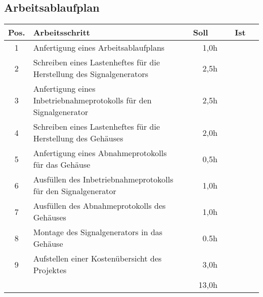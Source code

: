 \begin{landscape}

\section{Arbeitsablaufplan}
\begin{center}
\begin{tabular}{ll|r|r|}
\hline
\multicolumn{1}{|c|}{Pos.} & Arbeitsschritt & ~~Soll~~ & ~~Ist~~ \\ \hline
\multicolumn{1}{|c|}{1} & Anfertigung eines Arbeitsablaufplans & 1,0h &  \\ \hline
\multicolumn{1}{|c|}{2} & Schreiben eines Lastenheftes für die Herstellung des Signalgenerators & 2,5h &  \\ \hline
\multicolumn{1}{|c|}{3} & Anfertigung eines Inbetriebnahmeprotokolls für den Signalgenerator & 2,5h &  \\ \hline
\multicolumn{1}{|c|}{4} & Schreiben eines Lastenheftes für die Herstellung des Gehäuses & 2,0h &  \\ \hline
\multicolumn{1}{|c|}{5} & Anfertigung eines Abnahmeprotokolls für das Gehäuse & 0,5h &  \\ \hline
\multicolumn{1}{|c|}{6} & Ausfüllen des Inbetriebnahmeprotokolls für den Signalgenerator & 1,0h &  \\ \hline
\multicolumn{1}{|c|}{7} & Ausfüllen des Abnahmeprotokolls des Gehäuses & 1,0h &  \\ \hline
\multicolumn{1}{|c|}{8} & Montage des Signalgenerators in das Gehäuse & 0.5h &  \\ \hline
\multicolumn{1}{|c|}{9} & Aufstellen einer Kostenübersicht des Projektes & 3,0h &  \\ \hline
                       &  & 13,0h &  \\ \cline{3-4} 
\end{tabular}
\end{center}
\end{landscape}
